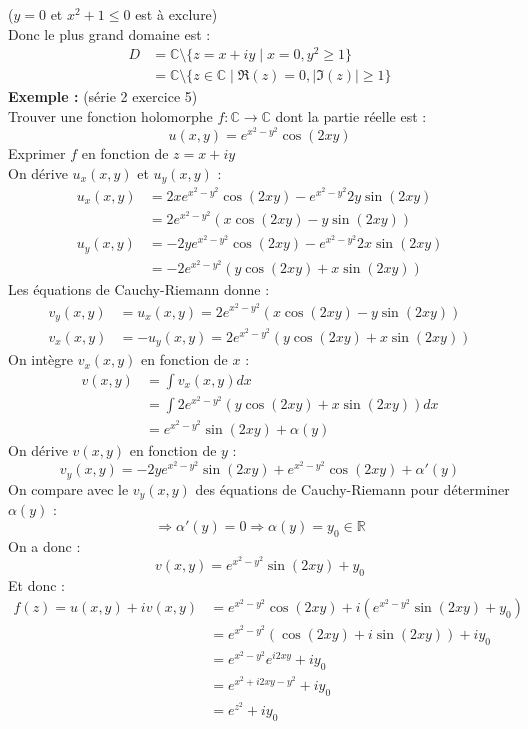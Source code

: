 ($y=0$ et $x^2+1 \leq 0$ est à exclure) \\
Donc le plus grand domaine est :
\begin{align*}
    D &= \mathbb{C} \setminus \{z = x+iy \mid x = 0, y^2 \geq 1\} \\
    &= \mathbb{C} \setminus \{z \in \mathbb{C} \mid \Re(z) = 0, |\Im(z)| \geq 1\}
\end{align*}
\textbf{Exemple :} (série 2 exercice 5) \\
Trouver une fonction holomorphe $f : \mathbb{C} \to \mathbb{C}$ dont la partie réelle est :
$$u(x,y) = e^{x^2-y^2}\cos(2xy)$$
Exprimer $f$ en fonction de $z=x+iy$ \\
On dérive $u_x(x,y)$ et $u_y(x,y)$ :
\begin{align*}
    u_x(x,y) &= 2xe^{x^2-y^2}\cos(2xy)-e^{x^2-y^2}2y\sin(2xy) \\
    &= 2e^{x^2-y^2}(x\cos(2xy) - y\sin(2xy)) \\
    u_y(x,y)& = -2ye^{x^2-y^2}\cos(2xy)-e^{x^2-y^2}2x\sin(2xy) \\
    &= -2e^{x^2-y^2}(y\cos(2xy)+x\sin(2xy))
\end{align*}
Les équations de Cauchy-Riemann donne :
\begin{align*}
    v_y(x,y) &= u_x(x,y) = 2e^{x^2-y^2}(x\cos(2xy) - y\sin(2xy)) \\
    v_x(x,y) &= -u_y(x,y) = 2e^{x^2-y^2}(y\cos(2xy)+x\sin(2xy))
\end{align*}
On intègre $v_x(x,y)$ en fonction de $x$ :
\begin{align*}
    v(x,y) &= \int v_x(x,y) dx \\
    &= \int 2e^{x^2-y^2}(y\cos(2xy)+x\sin(2xy)) dx \\
    &= e^{x^2-y^2}\sin(2xy) + \alpha(y)
\end{align*}
On dérive $v(x,y)$ en fonction de $y$ :
$$v_y(x,y) = -2ye^{x^2-y^2}\sin(2xy)+e^{x^2-y^2}\cos(2xy) + \alpha'(y)$$
On compare avec le $v_y(x,y)$ des équations de Cauchy-Riemann pour déterminer $\alpha(y)$ :
$$\Rightarrow \alpha'(y) = 0 \Rightarrow \alpha(y) = y_0 \in \mathbb{R}$$
On a donc :
$$v(x,y) = e^{x^2-y^2}\sin(2xy) + y_0$$
Et donc :
\begin{align*}
    f(z) = u(x,y) +iv(x,y) &= e^{x^2-y^2}\cos(2xy) + i(e^{x^2-y^2}\sin(2xy)+y_0) \\
    &= e^{x^2-y^2}(\cos(2xy) +i\sin(2xy)) +iy_0 \\
    &= e^{x^2-y^2}e^{i2xy} +iy_0 \\
    &= e^{x^2+i2xy-y^2} +iy_0 \\
    &= e^{z^2} + iy_0
\end{align*}